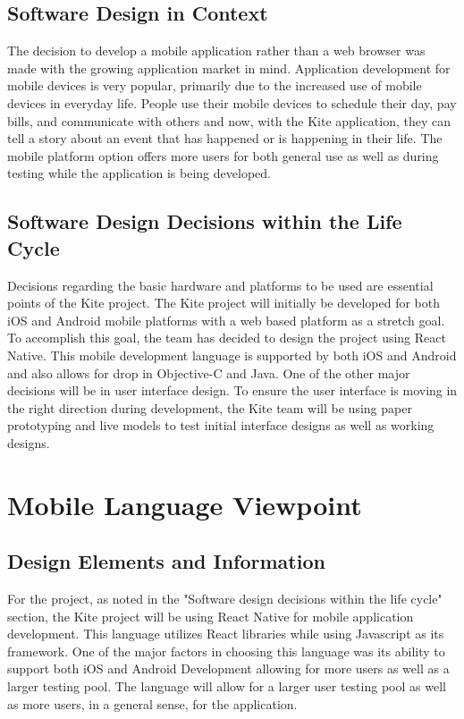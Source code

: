 \documentclass[compsoc, 10, draftclsnofoot, onecolumn]{IEEEtran}
\begin{document}
\subsection{Software Design in Context}
The decision to develop a mobile application rather than a web browser was made with the growing application market in mind. Application development for mobile devices is very popular, primarily due to the increased use of mobile devices in everyday life. People use their mobile devices to schedule their day, pay bills, and communicate with others and now, with the Kite application, they can tell a story about an event that has happened or is happening in their life. The mobile platform option offers more users for both general use as well as during testing while the application is being developed. 

\subsection{Software Design Decisions within the Life Cycle}
Decisions regarding the basic hardware and platforms to be used are essential points of the Kite project. The Kite project will initially be developed for both iOS and Android mobile platforms with a web based platform as a stretch goal. To accomplish this goal, the team has decided to design the project using React Native. This mobile development language is supported by both iOS and Android and also allows for drop in Objective-C and Java. One of the other major decisions will be in user interface design. To ensure the user interface is moving in the right direction during development, the Kite team will be using paper prototyping and live models to test initial interface designs as well as working designs.    

\section{Mobile Language Viewpoint}
\subsection{Design Elements and Information} For the project, as noted in the "Software design decisions within the life cycle" section, the Kite project will be using React Native for mobile application development. This language utilizes React libraries while using Javascript as its framework. One of the major factors in choosing this language was its ability to support both iOS and Android Development allowing for more users as well as a larger testing pool. The language will allow for a larger user testing pool as well as more users, in a general sense, for the application.
\end{document}
